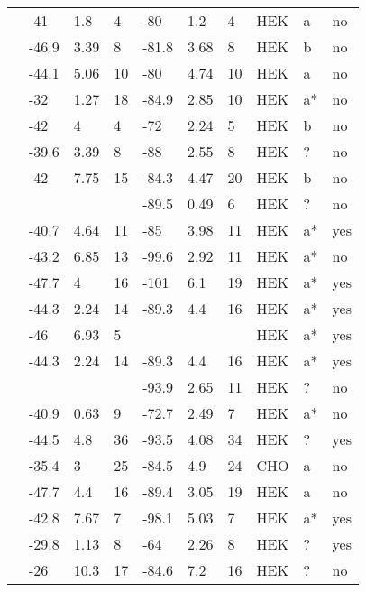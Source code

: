 \begin{longtable}{p{5cm}|lll|lll|lll}
\citet{Tan2005MutationDB} & -41 & 1.8 & 4 & -80 & 1.2 & 4 & HEK & a & no \\
\citet{Tan2006MutationDB} & -46.9 & 3.39 & 8 & -81.8 & 3.68 & 8 & HEK & b & no \\
\citet{Tan2006MutationDB} & -44.1 & 5.06 & 10 & -80 & 4.74 & 10 & HEK & a & no \\
\citet{Tarradas2013MutationDB} & -32 & 1.27 & 18 & -84.9 & 2.85 & 10 & HEK & a* & no \\
\citet{Tester2010MutationDB} & -42 & 4 & 4 & -72 & 2.24 & 5 & HEK & b & no \\
\citet{Tsurugi2009MutationDB} & -39.6 & 3.39 & 8 & -88 & 2.55 & 8 & HEK & ? & no \\
\citet{Valdivia2004MutationDB} & -42 & 7.75 & 15 & -84.3 & 4.47 & 20 & HEK & b & no \\
\citet{Vatta2002aMutationDB} & && & -89.5 & 0.49 & 6 & HEK & ? & no \\
\citet{Viswanathan2003MutationDB} & -40.7 & 4.64 & 11 & -85 & 3.98 & 11 & HEK & a* & yes \\
\citet{Wang1996MutationDB} & -43.2 & 6.85 & 13 & -99.6 & 2.92 & 11 & HEK & a* & no \\
\citet{Wang2002MutationDB} & -47.7 & 4 & 16 & -101 & 6.1 & 19 & HEK & a* & yes \\
\citet{Wang2007aMutationDB} & -44.3 & 2.24 & 14 & -89.3 & 4.4 & 16 & HEK & a* & yes \\
\citet{Wang2007bMutationDB} & -46 & 6.93 & 5 & && & HEK & a* & yes \\
\citet{Wang2008MutationDB} & -44.3 & 2.24 & 14 & -89.3 & 4.4 & 16 & HEK & a* & yes \\
\citet{Wang2011MutationDB} & && & -93.9 & 2.65 & 11 & HEK & ? & no \\
\citet{Wang2015MutationDB} & -40.9 & 0.63 & 9 & -72.7 & 2.49 & 7 & HEK & a* & no \\
\citet{Wang2016MutationDB} & -44.5 & 4.8 & 36 & -93.5 & 4.08 & 34 & HEK & ? & yes \\
\citet{Watanabe2011bMutationDB} & -35.4 & 3 & 25 & -84.5 & 4.9 & 24 & CHO & a & no \\
\citet{Watanabe2011bMutationDB} & -47.7 & 4.4 & 16 & -89.4 & 3.05 & 19 & HEK & a & no \\
\citet{Wedekind2001MutationDB} & -42.8 & 7.67 & 7 & -98.1 & 5.03 & 7 & HEK & a* & yes \\
\citet{Wehrens2003MutationDB} & -29.8 & 1.13 & 8 & -64 & 2.26 & 8 & HEK & ? & yes \\
\citet{Winkel2012MutationDB} & -26 & 10.3 & 17 & -84.6 & 7.2 & 16 & HEK & ? & no \\

\end{longtable}
